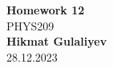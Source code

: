 \begin{titlepage}
    \begin{center}
    {\fontsize{40}{48}\selectfont \bfseries Homework 12} 
    \\\vspace{20pt}
    {\LARGE PHYS209} \\
    \vspace{20pt}
    \textbf{Hikmat Gulaliyev}
    \vspace{8pt}
    \\ 28.12.2023
    \end{center}
\end{titlepage}